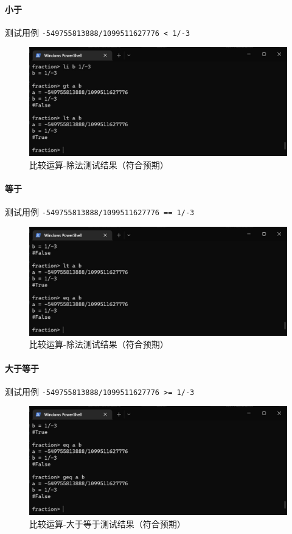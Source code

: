 \documentclass[cn,black,12pt,normal]{elegantnote}
\begin{document}
\paragraph{小于} 测试用例 \lstinline{-549755813888/1099511627776 < 1/-3}
\begin{figure}[H]
    \centering
    \includegraphics[width=.8\textwidth]{imgs/test_r_lt.jpg}
    \caption{比较运算-除法测试结果（符合预期）}
\end{figure}

\paragraph{等于} 测试用例 \lstinline{-549755813888/1099511627776 == 1/-3}
\begin{figure}[H]
    \centering
    \includegraphics[width=.8\textwidth]{imgs/test_r_eq.jpg}
    \caption{比较运算-除法测试结果（符合预期）}
\end{figure}

\paragraph{大于等于} 测试用例 \lstinline{-549755813888/1099511627776 >= 1/-3}
\begin{figure}[H]
    \centering
    \includegraphics[width=.8\textwidth]{imgs/test_r_geq.jpg}
    \caption{比较运算-大于等于测试结果（符合预期）}
\end{figure}
\end{document}
